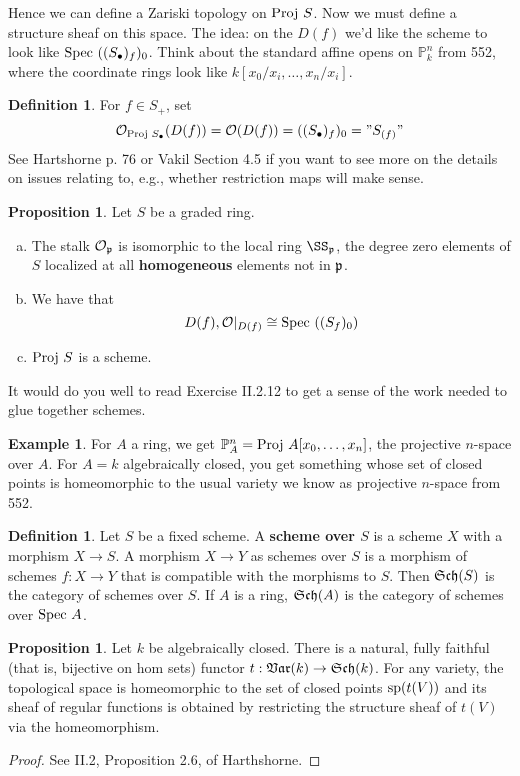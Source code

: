 \documentclass[10pt,reqno]{amsart}
\theoremstyle{definition}
\newtheorem{example}[theorem]{Example}
\newtheorem{definition}[theorem]{Definition}
\newtheorem{proposition}[theorem]{Proposition}
\theoremstyle{remark}
\numberwithin{equation}{section}
\numberwithin{theorem}{section}
\newcommand{\OO}{{\mathcal O}}
\newcommand{\spec}{\textup{Spec }}
\newcommand{\proj}{\textup{Proj }}
\newcommand{\pp}{\frak{p}}
\newcommand{\PP}{{\mathbb P}}
\begin{document}
Hence we can define a Zariski topology on $\proj S$. Now we must define a structure sheaf on this space. The idea: on the $D(f)$ we'd like the scheme to look like $\spec ((S_{\bullet})_f)_0$. Think about the standard affine opens on $\PP^n_k$ from 552, where the coordinate rings look like $k[x_0/x_i,\dots,x_n/x_i]$.

\begin{definition} For $f \in S_+$, set 
\[\OO_{\proj S_{\bullet}}(D(f)) = \OO(D(f)) = ((S_{\bullet})_f)_0 = "S_{(f)}"\]
See Hartshorne p. 76 or Vakil Section 4.5 if you want to see more on the details on issues relating to, e.g., whether restriction maps will make sense.
\end{definition}

\begin{proposition} Let $S$ be a graded ring.
\begin{enumerate}[(a)]
\item The stalk $\OO_{\pp}$ is isomorphic to the local ring $\SS_{\pp}$, the degree zero elements of $S$ localized at all \textbf{homogeneous} elements not in $\pp$.
\item We have that
\[D(f), \OO|_{D(f)} \cong \spec ((S_f)_0)\]
\item $\proj S$ is a scheme.
\end{enumerate}
\end{proposition}

It would do you well to read Exercise II.2.12 to get a sense of the work needed to glue together schemes.

\begin{example} For $A$ a ring, we get $\PP^n_A = \proj A[x_0,\dots,x_n]$, the projective $n$-space over $A$. For $A = k$ algebraically closed, you get something whose set of closed points is homeomorphic to the usual variety we know as projective $n$-space from 552.
\end{example}

\begin{definition} Let $S$ be a fixed scheme. A \textbf{scheme over $S$} is a scheme $X$ with a morphism $X \to S$. A morphism $X \to Y$ as schemes over $S$ is a morphism of schemes $f:X \to Y$ that is compatible with the morphisms to $S$. Then $\frak{Sch}(S)$ is the category of schemes over $S$. If $A$ is a ring, $\frak{Sch}(A)$ is the category of schemes over $\spec A$.
\end{definition}

\begin{proposition} Let $k$ be algebraically closed. There is a natural, fully faithful (that is, bijective on hom sets) functor $t: \frak{Var}(k) \to \frak{Sch}(k)$. For any variety, the topological space is homeomorphic to the set of closed points $\textup{sp}(t(V))$ and its sheaf of regular functions is obtained by restricting the structure sheaf of $t(V)$ via the homeomorphism.
\end{proposition}
\begin{proof}
See II.2, Proposition 2.6, of Harthshorne.
\end{proof}
\end{document}
